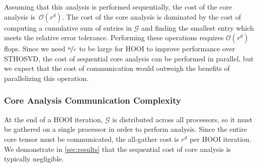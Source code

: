         Assuming that this analysis is performed sequentially, the cost of the
        core analysis is $\mathcal{O}(r^d)$. The cost of the core analysis is
        dominated by the cost of computing a cumulative sum of entries in
        $\mathcal{G}$ and finding the smallest entry which meets the relative error
        tolerance. Performing these operations requires $\mathcal{O}(r^d)$
        flops. Since we need $\nicefrac nr$ to be large for HOOI to improve performance
        over STHOSVD, the cost of sequential core analysis can be performed in
        parallel, but we expect that the cost of communication would outweigh
        the benefits of parallelizing this operation.

    \subsubsection{Core Analysis Communication Complexity} \label{sec:Core Analysis Communication Complexity}

        At the end of a HOOI iteration, $\mathcal{G}$ is distributed across all processors,
        so it must be gathered on a single processor in order to perform analysis. Since
        the entire core tensor must be communicated, the all-gather cost is $r^d$ per
        HOOI iteration.
        We demonstrate in \cref{sec:results} that the sequential cost of core analysis is typically negligible.


